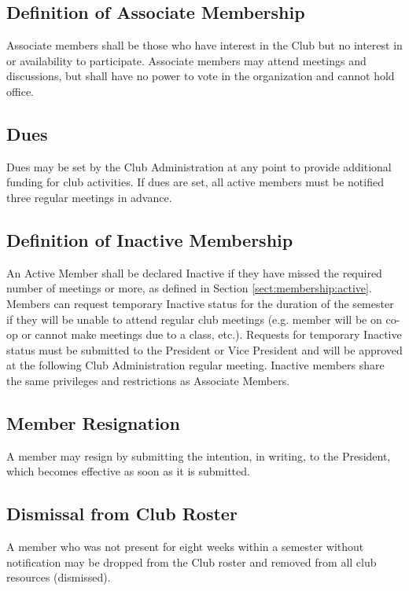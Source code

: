 \documentclass[english,11pt]{article}
\begin{document}
\subsection{Definition of Associate Membership} \label{sect:membership:associate}
Associate members shall be those who have interest in the Club but no interest in or availability to participate.
Associate members may attend meetings and discussions, but shall have no power to vote in the organization and cannot hold office.

\subsection{Dues} \label{sect:membership:dues}
Dues may be set by the Club Administration at any point to provide additional funding for club activities.
If dues are set, all active members must be notified three regular meetings in advance.

\subsection{Definition of Inactive Membership} \label{sect:membership:inactive}
An Active Member shall be declared Inactive if they have missed the required number of meetings or more, as defined in Section \ref{sect:membership:active}.
Members can request temporary Inactive status for the duration of the semester if they will be unable to attend regular club meetings (e.g. member will be on co-op or cannot make meetings due to a class, etc.).
Requests for temporary Inactive status must be submitted to the President or Vice President and will be approved at the following Club Administration regular meeting.
Inactive members share the same privileges and restrictions as Associate Members.

\subsection{Member Resignation} \label{sect:membership:resignation}
A member may resign by submitting the intention, in writing, to the President, which becomes effective as soon as it is submitted.

\subsection{Dismissal from Club Roster} \label{sect:membership:dismissal}
A member who was not present for eight weeks within a semester without notification may be dropped from the Club roster and removed from all club resources (dismissed).
\end{document}
